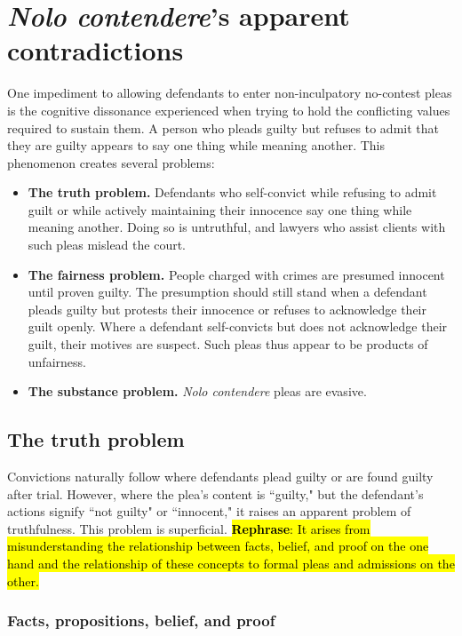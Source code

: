 \section{\textit{Nolo contendere}'s apparent contradictions}

One impediment to allowing defendants to enter non-inculpatory no-contest pleas is the cognitive dissonance experienced when trying to hold the conflicting values required to sustain them. A person who pleads guilty but refuses to admit that they are guilty appears to say one thing while meaning another. This phenomenon creates several problems:

\begin{itemize}
    \item \textbf{The truth problem.} Defendants who self-convict while refusing to admit guilt or while actively maintaining their innocence say one thing while meaning another. Doing so is untruthful, and lawyers who assist clients with such pleas mislead the court. 
    \item \textbf{The fairness problem.} People charged with crimes are presumed innocent until proven guilty. The presumption should still stand when a defendant pleads guilty but protests their innocence or refuses to acknowledge their guilt openly. Where a defendant self-convicts but does not acknowledge their guilt, their motives are suspect. Such pleas thus appear to be products of unfairness. 
    \item \textbf{The substance problem.} \textit{Nolo contendere} pleas are evasive.
\end{itemize}

\subsection{The truth problem}

Convictions naturally follow where defendants plead guilty or are found guilty after trial. However, where the plea's content is ``guilty," but the defendant's actions signify ``not guilty" or ``innocent," it raises an apparent problem of truthfulness. This problem is superficial. \hl{\textbf{Rephrase}: It arises from misunderstanding the relationship between facts, belief, and proof on the one hand and the relationship of these concepts to formal pleas and admissions on the other.}

\subsubsection{Facts, propositions, belief, and proof}

